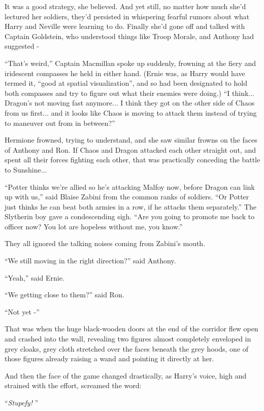 It was a good strategy, she believed. And yet still, no matter how much
she'd lectured her soldiers, they'd persisted in whispering fearful
rumors about what Harry and Neville were learning to do. Finally she'd
gone off and talked with Captain Goldstein, who understood things like
Troop Morale, and Anthony had suggested -

``That's weird,'' Captain Macmillan spoke up suddenly, frowning at the
fiery and iridescent compasses he held in either hand. (Ernie was, as
Harry would have termed it, ``good at spatial visualization'', and so
had been designated to hold both compasses and try to figure out what
their enemies were doing.) ``I think... Dragon's not moving fast
anymore... I think they got on the other side of Chaos from us
first... and it looks like Chaos is moving to attack them instead
of trying to maneuver out from in between?''

Hermione frowned, trying to understand, and she saw similar frowns on
the faces of Anthony and Ron. If Chaos and Dragon attacked each other
straight out, and spent all their forces fighting each other, that was
practically conceding the battle to Sunshine...

``Potter thinks we're allied so he's attacking Malfoy now, before Dragon
can link up with us,'' said Blaise Zabini from the common ranks of
soldiers. ``Or Potter just thinks he can beat both armies in a row, if
he attacks them separately.'' The Slytherin boy gave a condescending
sigh. ``Are you going to promote me back to officer now? You lot are
hopeless without me, you know.''

They all ignored the talking noises coming from Zabini's mouth.

``We still moving in the right direction?'' said Anthony.

``Yeah,'' said Ernie.

``We getting close to them?'' said Ron.

``Not yet -''

That was when the huge black-wooden doors at the end of the corridor
flew open and crashed into the wall, revealing two figures almost
completely enveloped in grey cloaks, grey cloth stretched over the faces
beneath the grey hoods, one of those figures already raising a wand and
pointing it directly at her.

And then the face of the game changed drastically, as Harry's voice,
high and strained with the effort, screamed the word:

``\emph{Stupefy!} ''

